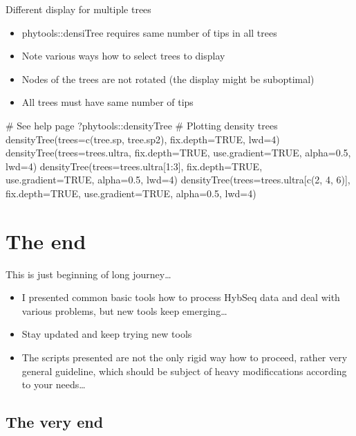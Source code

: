 \documentclass[compress,  xelatex, 11pt, xcolor=x11names, aspectratio=169,
	hyperref={
		bookmarks=true,
		unicode=true,
		colorlinks=true,
		pdftitle={HybSeq course},
		plainpages=false,
		pdfauthor={Vojtech Zeisek},
		pdfsubject={Practical processing of HybSeq target enrichment sequencing data on computing grids like MetaCentrum},
		pdfcreator={XeLaTeX},
		pdfkeywords={BASH, command line, GNU, HybSeq, Linux, MetaCentrum, sequencing shell, target enrichment},
		linkcolor=Turquoise4, %
		anchorcolor=DodgerBlue4, %
		citecolor=DodgerBlue4, %
		filecolor=DodgerBlue4, %
		menucolor=Tan4, %
		urlcolor=DarkOliveGreen4 %
		},
	url={hyphens, lowtilde} %
	]{beamer}
\renewcommand{\texttt}[1]{\colorbox{Cornsilk2}{{\ttfamily #1}}}
\begin{document}
\begin{frame}[fragile]{Different display for multiple trees}
	\begin{itemize}
		\item \texttt{phytools::densiTree} requires same number of tips in all trees
		\item Note various ways how to select trees to display
		\item Nodes of the trees are not rotated (the display might be suboptimal)
		\item All trees must have same number of tips
	\end{itemize}
	\begin{spluscode}
    # See help page
    ?phytools::densityTree
    # Plotting density trees
    densityTree(trees=c(tree.sp, tree.sp2), fix.depth=TRUE, lwd=4)
    densityTree(trees=trees.ultra, fix.depth=TRUE, use.gradient=TRUE,
      alpha=0.5, lwd=4)
    densityTree(trees=trees.ultra[1:3], fix.depth=TRUE, use.gradient=TRUE,
      alpha=0.5, lwd=4)
    densityTree(trees=trees.ultra[c(2, 4, 6)], fix.depth=TRUE,
      use.gradient=TRUE, alpha=0.5, lwd=4)
	\end{spluscode}
\end{frame}

\section{The end}

\begin{frame}{This is just beginning of long journey\ldots}
	\begin{itemize}
		\item I presented common basic tools how to process HybSeq data and deal with various problems, but new tools keep emerging\ldots
		\item Stay updated and keep trying new tools
		\item The scripts presented are not the only rigid way how to proceed, rather very general guideline, which should be subject of heavy modificcations according to your needs\ldots
	\end{itemize}
\end{frame}

\subsection{The very end}
\end{document}
